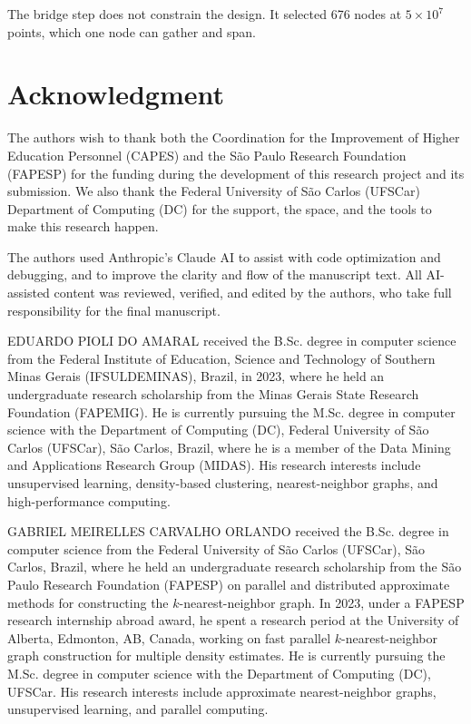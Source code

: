 \documentclass{ieeeaccess}
\newcounter{biography}
\begin{document}
The bridge step does not constrain the design. It selected 676 nodes at
$5\times10^7$ points, which one node can gather and span.

\section*{Acknowledgment}
The authors wish to thank both the Coordination for the Improvement of Higher Education Personnel (CAPES) and the São Paulo Research Foundation (FAPESP) for the funding during the development of this research project and its submission. We also thank the Federal University of São Carlos (UFSCar) Department of Computing (DC) for the support, the space, and the tools to make this research happen.

The authors used Anthropic's Claude AI to assist with code optimization and debugging, and to improve the clarity and flow of the manuscript text. All AI-assisted content was reviewed, verified, and edited by the authors, who take full responsibility for the final manuscript.




\begin{IEEEbiographynophoto}{EDUARDO PIOLI DO AMARAL}
received the B.Sc. degree in computer science from the Federal Institute of
Education, Science and Technology of Southern Minas Gerais (IFSULDEMINAS),
Brazil, in 2023, where he held an undergraduate research scholarship from the
Minas Gerais State Research Foundation (FAPEMIG). He is currently pursuing the
M.Sc. degree in computer science with the Department of Computing (DC), Federal
University of São Carlos (UFSCar), São Carlos, Brazil, where he is a member of
the Data Mining and Applications Research Group (MIDAS). His research interests
include unsupervised learning, density-based clustering, nearest-neighbor graphs,
and high-performance computing.
\end{IEEEbiographynophoto}

\begin{IEEEbiographynophoto}{GABRIEL MEIRELLES CARVALHO ORLANDO}
received the B.Sc. degree in computer science from the Federal University of São
Carlos (UFSCar), São Carlos, Brazil, where he held an undergraduate research
scholarship from the São Paulo Research Foundation (FAPESP) on parallel and
distributed approximate methods for constructing the $k$-nearest-neighbor graph.
In 2023, under a FAPESP research internship abroad award, he spent a research
period at the University of Alberta, Edmonton, AB, Canada, working on fast
parallel $k$-nearest-neighbor graph construction for multiple density estimates.
He is currently pursuing the M.Sc. degree in computer science with the Department
of Computing (DC), UFSCar. His research interests include approximate
nearest-neighbor graphs, unsupervised learning, and parallel computing.
\end{IEEEbiographynophoto}
\end{document}
